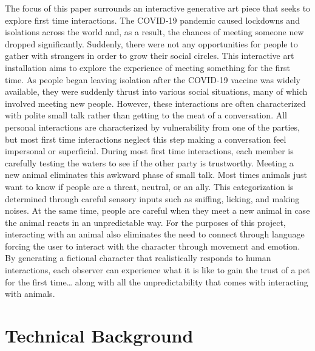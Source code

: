 \documentclass[10pt,twocolumn]{article}
\begin{document}
The focus of this paper surrounds an interactive generative art piece that seeks to explore first time interactions.  The COVID-19 pandemic caused lockdowns and isolations across the world and, as a result, the chances of meeting someone new dropped significantly.  Suddenly, there were not any opportunities for people to gather with strangers in order to grow their social circles.  This interactive art installation aims to explore the experience of meeting something for the first time.  As people began leaving isolation after the COVID-19 vaccine was widely available, they were suddenly thrust into various social situations, many of which involved meeting new people.  However, these interactions are often characterized with polite small talk rather than getting to the meat of a conversation.  All personal interactions are characterized by vulnerability from one of the parties, but most first time interactions neglect this step making a conversation feel impersonal or superficial.  During most first time interactions, each member is carefully testing the waters to see if the other party is trustworthy.  Meeting a new animal eliminates this awkward phase of small talk.  Most times animals just want to know if people are a threat, neutral, or an ally.  This categorization is determined through careful sensory inputs such as sniffing, licking, and making noises.  At the same time, people are careful when they meet a new animal in case the animal reacts in an unpredictable way.  For the purposes of this project, interacting with an animal also eliminates the need to connect through language forcing the user to interact with the character through movement and emotion. By generating a fictional character that realistically responds to human interactions, each observer can experience what it is like to gain the trust of a pet for the first time… along with all the unpredictability that comes with interacting with animals. 


\section{Technical Background}
\end{document}
